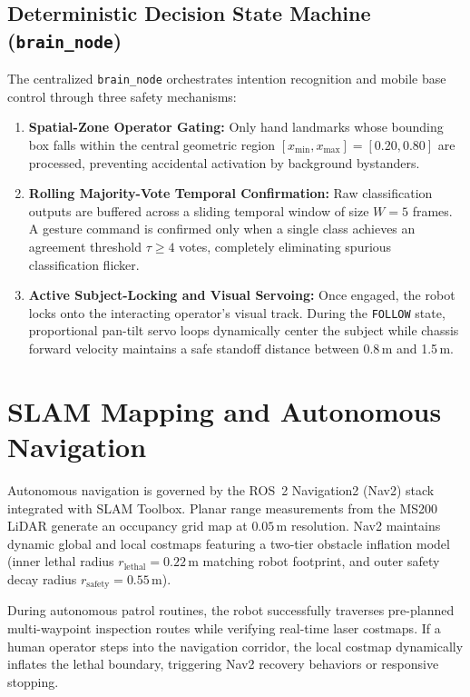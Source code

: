 \documentclass[journal]{IEEEtran}
\begin{document}
\subsection{Deterministic Decision State Machine (\texttt{brain\_node})}
The centralized \texttt{brain\_node} orchestrates intention recognition and mobile base control through three safety mechanisms:
\begin{enumerate}
    \item \textbf{Spatial-Zone Operator Gating:} Only hand landmarks whose bounding box falls within the central geometric region $[x_{\min}, x_{\max}] = [0.20, 0.80]$ are processed, preventing accidental activation by background bystanders.
    \item \textbf{Rolling Majority-Vote Temporal Confirmation:} Raw classification outputs are buffered across a sliding temporal window of size $W=5$ frames. A gesture command is confirmed only when a single class achieves an agreement threshold $\tau \ge 4$ votes, completely eliminating spurious classification flicker.
    \item \textbf{Active Subject-Locking and Visual Servoing:} Once engaged, the robot locks onto the interacting operator's visual track. During the \texttt{FOLLOW} state, proportional pan-tilt servo loops dynamically center the subject while chassis forward velocity maintains a safe standoff distance between 0.8\,m and 1.5\,m.
\end{enumerate}

\section{SLAM Mapping and Autonomous Navigation}
Autonomous navigation is governed by the ROS~2 Navigation2 (Nav2) stack integrated with SLAM Toolbox. Planar range measurements from the MS200 LiDAR generate an occupancy grid map at $0.05\,\text{m}$ resolution. Nav2 maintains dynamic global and local costmaps featuring a two-tier obstacle inflation model (inner lethal radius $r_{\text{lethal}} = 0.22\,\text{m}$ matching robot footprint, and outer safety decay radius $r_{\text{safety}} = 0.55\,\text{m}$).

During autonomous patrol routines, the robot successfully traverses pre-planned multi-waypoint inspection routes while verifying real-time laser costmaps. If a human operator steps into the navigation corridor, the local costmap dynamically inflates the lethal boundary, triggering Nav2 recovery behaviors or responsive stopping.
\end{document}
